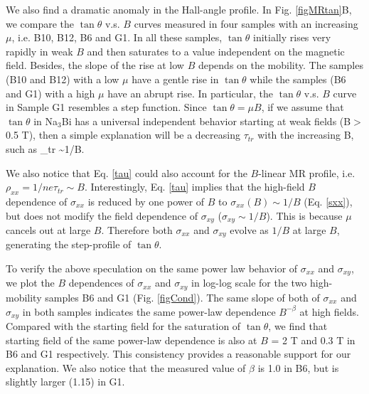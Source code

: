 We also find a dramatic anomaly in the Hall-angle profile. In Fig. \ref{figMRtan}B, we compare the $\tan\theta$ v.s. $B$ curves measured in four samples with an increasing $\mu$, i.e. B10, B12, B6 and G1. In all these samples, $\tan\theta$ initially rises very rapidly in weak $B$ and then saturates to a value independent on the magnetic field. Besides, the slope of the rise at low $B$ depends on the mobility. The samples (B10 and B12) with a low $\mu$ have a gentle rise in $\tan\theta$ while the samples (B6 and G1) with a high $\mu$ have an abrupt rise. In particular, the $\tan\theta$ v.s. $B$ curve in Sample G1 resembles a step function. Since $\tan\theta = \mu B$, if we assume that $\tan\theta$ in Na$_3$Bi has a universal independent behavior starting at weak fields (B$>$0.5 T), then a simple explanation will be a decreasing $\tau_{tr}$ with the increasing B, such as 
\be
\tau_{tr} \sim 1/B.
\label{tau}
\ee



We also notice that Eq. \ref{tau} could also account for the $B$-linear MR profile, i.e. 
$\rho_{xx} = 1/ne\tau_{tr} \sim B.$
Interestingly, Eq. \ref{tau} implies that the high-field $B$ dependence of $\sigma_{xx}$ is reduced by one power of $B$ to $\sigma_{xx}(B)\sim 1/B$ (Eq. \ref{sxx}), but does not modify the field dependence of $\sigma_{xy}$ ($\sigma_{xy}\sim 1/B$). This is because $\mu$ cancels out at large $B$. Therefore both $\sigma_{xx}$ and $\sigma_{xy}$ evolve as $1/B$ at large $B$, generating the step-profile of $\tan\theta$. 

To verify the above speculation on the same power law behavior of $\sigma_{xx}$ and $\sigma_{xy}$, we plot the $B$ dependences of $\sigma_{xx}$ and $\sigma_{xy}$ in log-log scale for the two high-mobility samples B6 and G1 (Fig. \ref{figCond}). The same slope of both of $\sigma_{xx}$ and $\sigma_{xy}$ in both samples indicates the same power-law dependence $B^{-\beta}$ at high fields. Compared with the starting field for the saturation of $\tan\theta$, we find that starting field of the same power-law dependence is also at $B$ = 2 T and 0.3 T in B6 and G1 respectively. This consistency provides a reasonable support for our explanation. We also notice that the measured value of $\beta$ is 1.0 in B6, but is slightly larger (1.15) in G1. 

